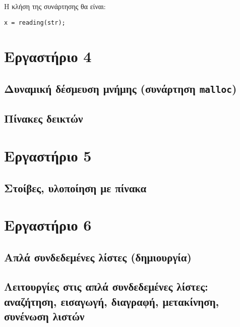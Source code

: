 \documentclass[14pt, fleqn, leqno]{extreport}
\begin{document}
Η κλήση της συνάρτησης θα είναι:
\begin{center}
    \lstinline{x = reading(str);}
\end{center}



\chapter{Εργαστήριο 4}

\section{Δυναμική δέσμευση μνήμης (συνάρτηση \lstinline{malloc})}



\section{Πίνακες δεικτών}

\chapter{Εργαστήριο 5}

\section{Στοίβες, υλοποίηση με πίνακα}

\chapter{Εργαστήριο 6}

\section{Απλά συνδεδεμένες λίστες (δημιουργία)}
\section{Λειτουργίες στις απλά συνδεδεμένες λίστες: αναζήτηση, εισαγωγή, διαγραφή, μετακίνηση, συνένωση λιστών}
\end{document}

